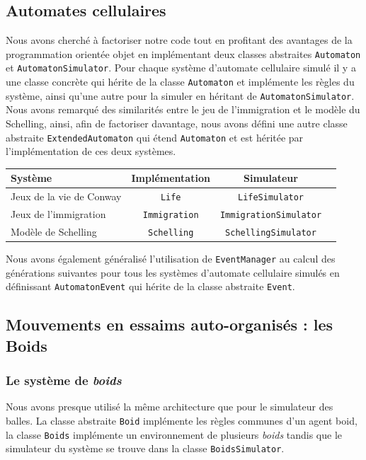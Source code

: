 \documentclass [a4paper,11pt,titlepage] {article}
\begin{document}
\subsection{Automates cellulaires}
Nous avons cherché à factoriser notre code tout en profitant des avantages de la programmation orientée objet en implémentant deux classes abstraites \texttt{Automaton} et \texttt{AutomatonSimulator}. Pour chaque système d'automate cellulaire simulé il y a une classe concrète qui hérite de la classe \texttt{Automaton} et implémente les règles du système, ainsi qu'une autre pour la simuler en héritant de \texttt{AutomatonSimulator}.
Nous avons remarqué des similarités entre le jeu de l'immigration et le modèle du Schelling, ainsi, afin de factoriser davantage, nous avons défini une autre classe abstraite \texttt{ExtendedAutomaton} qui étend \texttt{Automaton} et est héritée par l'implémentation de ces deux systèmes.

\begin{center}
\begin{tabular}{|l|c|c|c|}
  \hline
    Système & Implémentation & Simulateur \\
  \hline
   Jeux de la vie de Conway & \texttt{Life} & \texttt{LifeSimulator}\\
  \hline
  Jeux de l'immigration & \texttt{Immigration} & \texttt{ImmigrationSimulator}\\
  \hline
  Modèle de Schelling & \texttt{Schelling} & \texttt{SchellingSimulator}\\
  \hline
 
\end{tabular}
\end{center}

Nous avons également généralisé l'utilisation de \texttt{EventManager} au calcul des générations suivantes pour tous les systèmes d'automate cellulaire simulés en définissant \texttt{AutomatonEvent} qui hérite de la classe abstraite \texttt{Event}.


\subsection{Mouvements en essaims auto-organisés : les Boids}
\subsubsection {Le système de {\em boids}}
Nous avons presque utilisé la même architecture que pour le simulateur des balles. La classe abstraite \texttt{Boid} implémente les règles communes d'un agent boid, la classe \texttt{Boids} implémente un environnement de plusieurs {\em boids} tandis que le simulateur du système se trouve dans la classe \texttt{BoidsSimulator}. 
\end{document}
